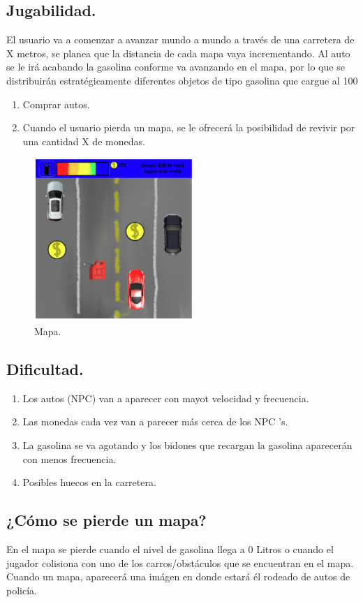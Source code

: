 \documentclass{article}
\begin{document}
\subsection{Jugabilidad.}
El usuario va a comenzar a avanzar mundo a mundo a través de una carretera de X metros, se planea que la distancia de cada mapa vaya incrementando. Al auto se le irá acabando la gasolina conforme va avanzando en el mapa, por lo que se distribuirán estratégicamente diferentes objetos de  tipo gasolina que cargue al 100%
\begin{enumerate}
    \item Comprar autos.
    \item Cuando el usuario pierda un mapa, se le ofrecerá la posibilidad de revivir por una cantidad X de monedas.
\end{enumerate}
\begin{figure}[h]
\includegraphics[width=6cm]{traffic_racer.PNG}
\centering
\caption{Mapa.}
\label{fig:mapa}
\end{figure}
\subsection{Dificultad.}
\begin{enumerate}
    \item Los autos (NPC) van a aparecer con mayot velocidad y frecuencia.
    \item Las monedas cada vez van a parecer más cerca de los NPC 's.
    \item La gasolina se va agotando y los bidones que recargan la gasolina aparecerán con menos frecuencia.
    \item Posibles huecos en la carretera.
\end{enumerate}
\subsection{¿Cómo se pierde un mapa?}
En el mapa se pierde cuando el nivel de gasolina llega a 0 Litros o cuando el jugador colisiona con uno de los carros/obstáculos que se encuentran en el mapa.
Cuando un mapa, aparecerá una imágen en donde estará él rodeado de autos de policía. 
\end{document}
